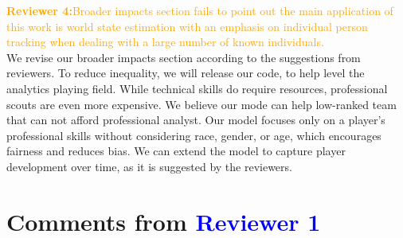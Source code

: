\documentclass[letterpaper]{article} %
\begin{document}
\begin{itemize}
\textcolor{orange}{\bf Reviewer 4:}\textcolor{orange}{Broader impacts section fails to point out the main application of this work is world state
estimation with an emphasis on individual person tracking when dealing with a large number of known individuals.}\\
We revise our broader impacts section according to the suggestions from reviewers. To reduce inequality, we will release our code, to help level the analytics playing field. While technical skills do require resources, professional scouts are even more expensive. We believe our mode can help low-ranked team that can not afford professional analyst.
Our model focuses only on a player's professional skills without considering race, gender, or age, which encourages fairness and reduces bias. We can extend the model to capture player development over time, as it is suggested by the reviewers.

\end{itemize}

\section{\bf Comments from \textcolor{Blue}{Reviewer 1}}
\end{document}
